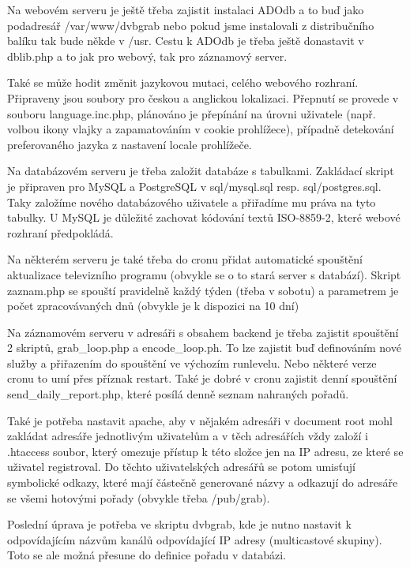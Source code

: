 \vspace{10pt}

Na webovém serveru je ještě třeba zajistit instalaci ADOdb a to buď jako podadresář /var/www/dvbgrab nebo pokud jsme instalovali z distribučního balíku tak bude někde v /usr. Cestu k ADOdb je třeba ještě donastavit v dblib.php a to jak pro webový, tak pro záznamový server.

\vspace{10pt}

Také se může hodit změnit jazykovou mutaci, celého webového rozhraní. Připraveny jsou soubory pro českou a anglickou lokalizaci. Přepnutí se provede v souboru language.inc.php, plánováno je přepínání na úrovni uživatele (např. volbou ikony vlajky a zapamatováním v cookie prohlížece), případně detekování preferovaného jazyka z nastavení locale prohlížeče.

\vspace{10pt}

Na databázovém serveru je třeba založit databáze s tabulkami. Zakládací skript je připraven pro MySQL a PostgreSQL v sql/mysql.sql resp. sql/postgres.sql. Taky založíme nového databázového uživatele a přiřadíme mu práva na tyto tabulky. U MySQL je důležité zachovat kódování textů ISO-8859-2, které webové rozhraní předpokládá.

\vspace{10pt}

Na některém serveru je také třeba do cronu přidat automatické spouštění aktualizace televizního programu (obvykle se o to stará server s databází). Skript zaznam.php se spouští pravidelně každý týden (třeba v sobotu) a parametrem je počet zpracovávaných dnů (obvykle je k dispozici na 10 dní) 

\vspace{10pt}

Na záznamovém serveru v adresáři s obsahem backend je třeba zajistit spouštění 2 skriptů, grab\_loop.php a encode\_loop.ph. To lze zajistit buď definováním nové služby a přiřazením do spouštění ve výchozím runlevelu. Nebo některé verze cronu to umí přes příznak restart. Také je dobré v cronu zajistit denní spouštění send\_daily\_report.php, které posílá denně seznam nahraných pořadů.

\vspace{10pt}

Také je potřeba nastavit apache, aby v nějakém adresáři v document root mohl zakládat adresáře jednotlivým uživatelům a v těch adresářích vždy založí i .htaccess soubor, který omezuje přístup k této složce jen na IP adresu, ze které se uživatel registroval. Do těchto uživatelských adresářů se potom umisťují symbolické odkazy, které mají částečně generované názvy a odkazují do adresáře se všemi hotovými pořady (obvykle třeba /pub/grab).

\vspace{10pt}

Poslední úprava je potřeba ve skriptu dvbgrab, kde je nutno nastavit k odpovídajícím názvům kanálů odpovídající IP adresy (multicastové skupiny). Toto se ale možná přesune do definice pořadu v databázi.

\vspace{10pt}

